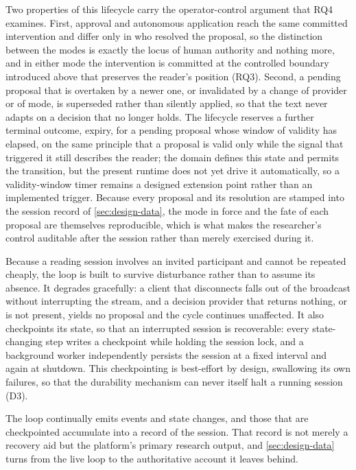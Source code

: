 Two properties of this lifecycle carry the operator-control argument that RQ4 examines.
First, approval and autonomous application reach the same committed intervention and differ only in who resolved the proposal, so the distinction between the modes is exactly the locus of human authority and nothing more, and in either mode the intervention is committed at the controlled boundary introduced above that preserves the reader's position (RQ3).
Second, a pending proposal that is overtaken by a newer one, or invalidated by a change of provider or of mode, is superseded rather than silently applied, so that the text never adapts on a decision that no longer holds.
The lifecycle reserves a further terminal outcome, expiry, for a pending proposal whose window of validity has elapsed, on the same principle that a proposal is valid only while the signal that triggered it still describes the reader; the domain defines this state and permits the transition, but the present runtime does not yet drive it automatically, so a validity-window timer remains a designed extension point rather than an implemented trigger.
Because every proposal and its resolution are stamped into the session record of \cref{sec:design-data}, the mode in force and the fate of each proposal are themselves reproducible, which is what makes the researcher's control auditable after the session rather than merely exercised during it.

Because a reading session involves an invited participant and cannot be repeated cheaply, the loop is built to survive disturbance rather than to assume its absence.
It degrades gracefully: a client that disconnects falls out of the broadcast without interrupting the stream, and a decision provider that returns nothing, or is not present, yields no proposal and the cycle continues unaffected.
It also checkpoints its state, so that an interrupted session is recoverable: every state-changing step writes a checkpoint while holding the session lock, and a background worker independently persists the session at a fixed interval and again at shutdown.
This checkpointing is best-effort by design, swallowing its own failures, so that the durability mechanism can never itself halt a running session (D3).

The loop continually emits events and state changes, and those that are checkpointed accumulate into a record of the session.
That record is not merely a recovery aid but the platform's primary research output, and \cref{sec:design-data} turns from the live loop to the authoritative account it leaves behind.
